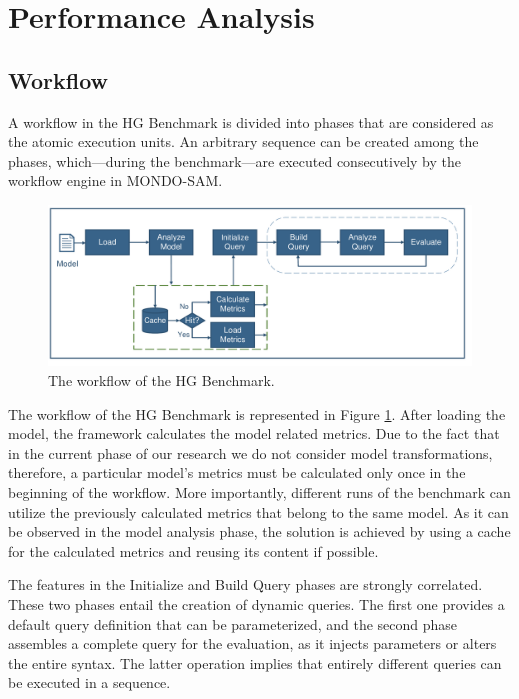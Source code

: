\section{Performance Analysis}

\subsection{Workflow}

A workflow in the HG Benchmark is divided into phases that are considered as the atomic execution units. An arbitrary sequence can be created among the phases, which---during the benchmark---are executed consecutively by the workflow engine in MONDO-SAM.

\begin{figure}[!ht]
	\centering
	\includegraphics[width=150mm, keepaspectratio]{figures/workflow.pdf}
	\caption{The workflow of the HG Benchmark.}
	\label{fig:mondo_map_workflow}
\end{figure}

The workflow of the HG Benchmark is represented in Figure \ref{fig:mondo_map_workflow}. After loading the model, the framework calculates the model related metrics. Due to the fact that in the current phase of our research we do not consider model transformations, therefore, a particular model's metrics must be calculated only once in the beginning of the workflow. More importantly, different runs of the benchmark can utilize the previously calculated metrics that belong to the same model. As it can be observed in the model analysis phase, the solution is achieved by using a cache for the calculated metrics and reusing its content if possible.

The features in the \textsf{Initialize} and \textsf{Build Query} phases are strongly correlated. These two phases entail the creation of dynamic queries. The first one provides a default query definition that can be parameterized, and the second phase assembles a complete query for the evaluation, as it injects parameters or alters the entire syntax. The latter operation implies that entirely different queries can be executed in a sequence.

